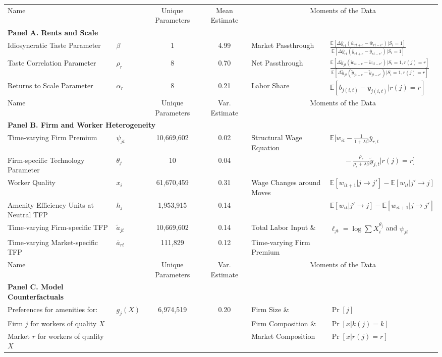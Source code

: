\begin{tabular}{llccll}
\toprule 
\midrule 
Name &   & Unique Parameters & Mean Estimate & \multicolumn{2}{c}{Moments of the Data} \\
 \cmidrule(lr){1-4} \cmidrule(lr){5-6} 
\textbf{Panel A. Rents and Scale} \\
Idiosyncratic Taste Parameter & $\beta$ & 1 & 4.99 & Market Passthrough & $\frac{\mathbb{E}\left[\Delta \bar{y}_{rt}\left(\bar{w}_{rt+e}-\bar{w}_{rt-e'}\right)|S_{i}{=}1\right]}{\mathbb{E}\left[\Delta \bar{y}_{rt}\left(\bar{y}_{rt+e}-\bar{y}_{rt-e'}\right)|S_{i}{=}1\right]}$ \\
Taste Correlation Parameter & $\rho_r$ & 8 & 0.70 & Net Passthrough & $\frac{\mathbb{E}\left[\Delta \tilde{y}_{jt}\left(\tilde{w}_{it+e}-\tilde{w}_{it-e'}\right)|S_{i}{=}1,r(j)=r\right]}{\mathbb{E}\left[\Delta \tilde{y}_{jt}\left(\tilde{y}_{jt+e}-\tilde{y}_{jt-e'}\right)|S_{i}{=}1,r(j)=r\right]}$ \\
Returns to Scale Parameter & $\alpha_r$ & 8 & 0.21 & Labor Share & $\mathbb{E}[b_{j(i,t)} - y_{j(i,t)}|r(j)=r]$ \\[5pt]
\midrule 
Name &   & Unique Parameters & Var. Estimate & \multicolumn{2}{c}{Moments of the Data} \\
 \cmidrule(lr){1-4} \cmidrule(lr){5-6} 
\multicolumn{3}{l}{\textbf{Panel B. Firm and Worker Heterogeneity}} \\
Time-varying Firm Premium & $\psi_{jt}$ & 10,669,602 & 0.02 & Structural Wage Equation & $\mathbb{E}[w_{it}{-}\frac{1}{1+\lambda\beta}\bar{y}_{r,t}$ \\
Firm-specific Technology Parameter & $\theta_j$ & 10 & 0.04 &   & $\qquad {-}\frac{\rho_{r}}{\rho_{r}+\lambda\beta}\tilde{y}_{j,t} | r(j)=r]$ \\
Worker Quality & $x_i$ & 61,670,459 & 0.31 & Wage Changes around Moves & $\mathbb{E}[w_{it+1}|j \rightarrow j'] - \mathbb{E}[w_{it}|j' \rightarrow j]$ \\
Amenity Efficiency Units at Neutral TFP & $h_j$ & 1,953,915 & 0.14 &   & $\mathbb{E}[w_{it}|j' \rightarrow j] - \mathbb{E}[w_{it+1}|j \rightarrow j']$ \\[10pt]
Time-varying Firm-specific TFP & $\tilde{a}_{jt}$ & 10,669,602 & 0.14 & Total Labor Input \& & $\ell_{jt}=\log \sum X_i^{\theta_j}$ and $\psi_{jt}$ \\
Time-varying Market-specific TFP & $\overline{a}_{rt}$ & 111,829 & 0.12 & Time-varying Firm Premium &  \\[5pt]
\midrule 
Name &   & Unique Parameters & Var. Estimate & \multicolumn{2}{c}{Moments of the Data} \\
 \cmidrule(lr){1-4} \cmidrule(lr){5-6} 
\textbf{Panel C. Model Counterfactuals} \\
Preferences for amenities for: & $g_{j}(X)$ & 6,974,519 & 0.20 & Firm Size \& & $\Pr[j]$ \\
Firm $j$ for workers of quality $X$ &   &  &  & Firm Composition \& & $\Pr[x | k(j)=k]$ \\
Market $r$ for workers of quality $X$ &   &   &   & Market Composition & $\Pr[x | r(j)=r]$ \\
\midrule 
\bottomrule 
\end{tabular}
